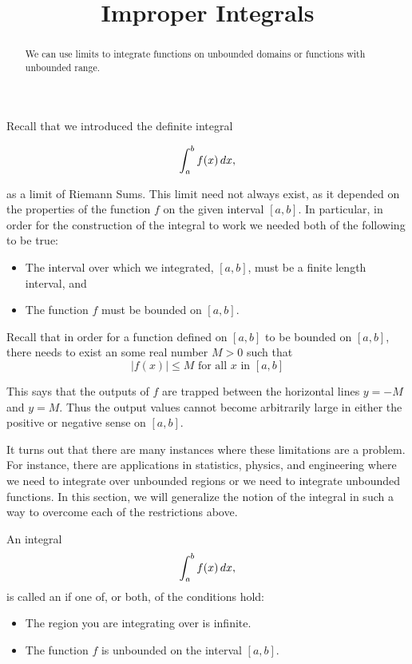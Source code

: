 \documentclass{ximera}
\title[Dig-In:]{Improper Integrals}
\begin{document}
\begin{abstract}
  We can use limits to integrate functions on unbounded domains or functions with unbounded range.
\end{abstract}
\maketitle


Recall that we introduced the definite integral

\[
\int_a^b f(x) \mathop{}\!d x,
\]

as a limit of Riemann Sums. This limit need not always exist, as it depended on the properties of the
function $f$ on the given interval $[a, b]$. In particular, in order for the construction of the integral to work 
we needed both of the following to be true: 

\begin{itemize}
\item The interval over which we integrated, $[a,b]$, must be a finite length
  interval, and
\item The function $f$ must be bounded on $[a,b]$.
\end{itemize}


\begin{remark}
Recall that in order for a function defined on $[a, b]$ to be bounded on $[a,b]$, there needs to exist an some real number $M>0$ such that 
\[
|f(x)| \leq M \text{ for all } x \text{ in } [a, b]
\]

This says that the outputs of $f$ are trapped between the horizontal lines $y=-M$ and $y=M$. Thus the output values cannot 
become arbitrarily large in either the positive or negative sense on $[a,b]$. 
\end{remark}


It turns out that there are many instances where these limitations are a problem.  For instance, there are applications in statistics, physics, and engineering where we need to integrate over unbounded regions or we need to integrate unbounded functions.  In this section, we will generalize the notion of the integral in such a way to overcome each of the restrictions above.



\begin{definition}
  An integral
  \[
  \int_a^b f(x) \mathop{}\!d x,
  \]
  is called an  if one of, or both, of the conditions hold:
  \begin{itemize}
  \item The region you are integrating over is infinite.
  \item The function $f$ is unbounded on the interval $[a,b]$.
  \end{itemize}
\end{definition}
\end{document}
